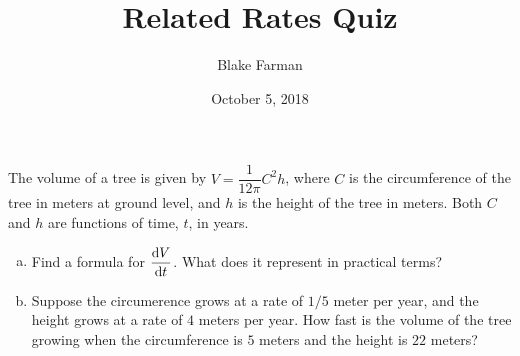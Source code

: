 \documentclass[10pt]{amsart}
\title[Chain Rule]{Related Rates Quiz}
\date{October 5, 2018}
\author{Blake Farman}
\begin{document}
\maketitle

\makenameslot

\begin{thm}
  The volume of a tree is given by \(V = \dfrac{1}{12\pi}C^2h\), where \(C\) is the circumference of the tree in meters at ground level, and \(h\) is the height of the tree in meters.
  Both \(C\) and \(h\) are functions of time, \(t\), in years.
  \begin{enumerate}[(a)]
  \item
    Find a formula for \(\dfrac{\dif V}{\dif t}\).
    What does it represent in practical terms?
    \vspace{2in}
  \item
    Suppose the circumerence grows at a rate of \(1/5\) meter per year, and the height grows at a rate of \(4\) meters per year.
    How fast is the volume of the tree growing when the circumference is \(5\) meters and the height is \(22\) meters?
  \end{enumerate}
\end{thm}
\end{document}
